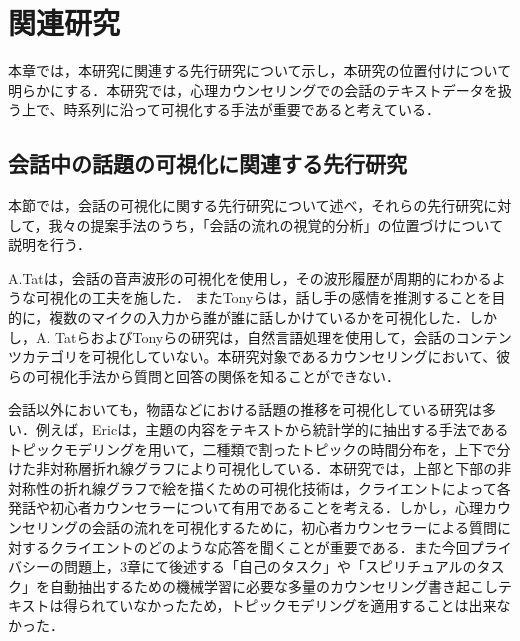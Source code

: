 \documentclass[shuuron]{kuee}
\begin{document}







\chapter{関連研究}






本章では，本研究に関連する先行研究について示し，本研究の位置付けについて明らかにする．本研究では，心理カウンセリングでの会話のテキストデータを扱う上で、時系列に沿って可視化する手法が重要であると考えている．

\section{会話中の話題の可視化に関連する先行研究}

本節では，会話の可視化に関する先行研究について述べ，それらの先行研究に対して，我々の提案手法のうち，「会話の流れの視覚的分析」の位置づけについて説明を行う．

A.Tat\cite{tat2002visualising}は，会話の音声波形の可視化を使用し，その波形履歴が周期的にわかるような可視化の工夫を施した．
またTonyら\cite{bergstrom2007seeing}は，話し手の感情を推測することを目的に，複数のマイクの入力から誰が誰に話しかけているかを可視化した．しかし，A. TatらおよびTonyらの研究は，自然言語処理を使用して，会話のコンテンツカテゴリを可視化していない。本研究対象であるカウンセリングにおいて、彼らの可視化手法から質問と回答の関係を知ることができない．

会話以外においても，物語などにおける話題の推移を可視化している研究は多い．例えば，Eric\cite{taskdriven}は，主題の内容をテキストから統計学的に抽出する手法であるトピックモデリングを用いて，二種類で割ったトピックの時間分布を，上下で分けた非対称層折れ線グラフにより可視化している．本研究では，上部と下部の非対称性の折れ線グラフで絵を描くための可視化技術は，クライエントによって各発話や初心者カウンセラーについて有用であることを考える．しかし，心理カウンセリングの会話の流れを可視化するために，初心者カウンセラーによる質問に対するクライエントのどのような応答を聞くことが重要である．また今回プライバシーの問題上，3章にて後述する「自己のタスク」や「スピリチュアルのタスク」を自動抽出するための機械学習に必要な多量のカウンセリング書き起こしテキストは得られていなかったため，トピックモデリングを適用することは出来なかった．
\end{document}
